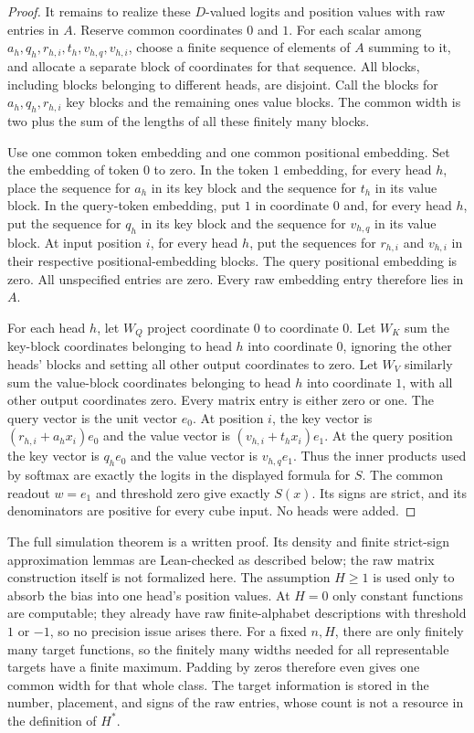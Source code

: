 \documentclass[11pt]{article}
\begin{document}
\begin{proof}
It remains to realize these $D$-valued logits and position values
with raw entries in $A$. Reserve common coordinates $0$ and $1$.
For each scalar among $a_h,q_h,r_{h,i},t_h,v_{h,q},v_{h,i}$,
choose a finite sequence of elements of $A$ summing to it, and
allocate a separate block of coordinates for that sequence. All
blocks, including blocks belonging to different heads, are disjoint.
Call the blocks for $a_h,q_h,r_{h,i}$ key blocks and the remaining
ones value blocks. The common width is two plus the sum of the
lengths of all these finitely many blocks.

Use one common token embedding and one common positional embedding.
Set the embedding of token $0$ to zero. In the token $1$ embedding,
for every head $h$, place the sequence for $a_h$ in its key block
and the sequence for $t_h$ in its value block. In the query-token
embedding, put $1$ in coordinate $0$ and, for every head $h$,
put the sequence for $q_h$ in its key block and the sequence for
$v_{h,q}$ in its value block. At input position $i$, for every
head $h$, put the sequences for $r_{h,i}$ and $v_{h,i}$ in their
respective positional-embedding blocks. The query positional
embedding is zero. All unspecified entries are zero. Every raw
embedding entry therefore lies in $A$.

For each head $h$, let $W_Q$ project coordinate $0$ to coordinate
$0$. Let $W_K$ sum the key-block coordinates belonging to head
$h$ into coordinate $0$, ignoring the other heads' blocks and
setting all other output coordinates to zero. Let $W_V$ similarly
sum the value-block coordinates belonging to head $h$ into
coordinate $1$, with all other output coordinates zero. Every
matrix entry is either zero or one. The query vector is the unit
vector $e_0$. At position $i$, the key vector is
$(r_{h,i}+a_hx_i)e_0$ and the value vector is
$(v_{h,i}+t_hx_i)e_1$. At the query position the key vector is
$q_he_0$ and the value vector is $v_{h,q}e_1$. Thus the inner
products used by softmax are exactly the logits in the displayed
formula for $S$. The common readout $w=e_1$ and threshold zero
give exactly $S(x)$. Its signs are strict, and its denominators are
positive for every cube input. No heads were added.
\end{proof}

The full simulation theorem is a written proof. Its density and
finite strict-sign approximation lemmas are Lean-checked as described
below; the raw matrix construction itself is not formalized here.
The assumption $H\ge1$ is used only to absorb the bias into one
head's position values. At $H=0$ only constant functions are
computable; they already have raw finite-alphabet descriptions with
threshold $1$ or $-1$, so no precision issue arises there.
For a fixed $n,H$, there are only finitely many target functions, so
the finitely many widths needed for all representable targets have
a finite maximum. Padding by zeros therefore even gives one common
width for that whole class. The target information is stored in the
number, placement, and signs of the raw entries, whose count is not
a resource in the definition of $H^\ast$.
\end{document}
